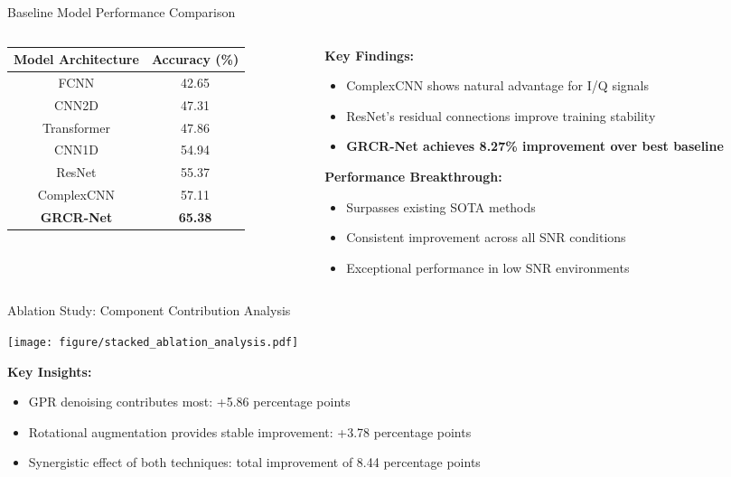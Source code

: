\documentclass[aspectratio=169]{beamer}
\begin{document}
\begin{frame}{Baseline Model Performance Comparison}
\begin{columns}
\begin{column}{0.5\textwidth}
\begin{table}[h]
\centering
\begin{tabular}{@{}cc@{}}
\toprule
\textbf{Model Architecture} & \textbf{Accuracy (\%)} \\
\midrule
FCNN & 42.65 \\
CNN2D & 47.31 \\
Transformer & 47.86 \\
CNN1D & 54.94 \\
ResNet & 55.37 \\
ComplexCNN & 57.11 \\
\midrule
\textcolor{zjutred}{\textbf{GRCR-Net}} & \textcolor{zjutred}{\textbf{65.38}} \\
\bottomrule
\end{tabular}
\end{table}
\end{column}
\begin{column}{0.5\textwidth}
\textbf{Key Findings:}
\begin{itemize}
\item ComplexCNN shows natural advantage for I/Q signals
\item ResNet's residual connections improve training stability
\item \textcolor{zjutred}{\textbf{GRCR-Net achieves 8.27\% improvement over best baseline}}
\end{itemize}

\vspace{0.5cm}
\textbf{Performance Breakthrough:}
\begin{itemize}
\item Surpasses existing SOTA methods
\item Consistent improvement across all SNR conditions
\item Exceptional performance in low SNR environments
\end{itemize}
\end{column}
\end{columns}
\end{frame}

\begin{frame}{Ablation Study: Component Contribution Analysis}
\begin{center}
\texttt{[image: figure/stacked\_ablation\_analysis.pdf]}
\end{center}

\textbf{Key Insights:}
\begin{itemize}
\item GPR denoising contributes most: +5.86 percentage points
\item Rotational augmentation provides stable improvement: +3.78 percentage points
\item Synergistic effect of both techniques: total improvement of 8.44 percentage points
\end{itemize}
\end{frame}
\end{document}
